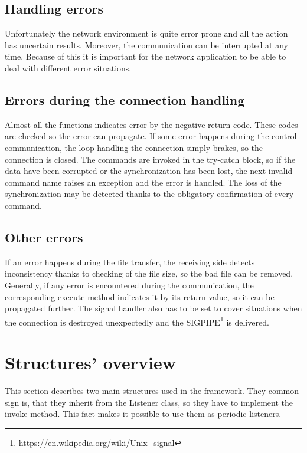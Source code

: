 \subsection{Handling errors}\label{handling-errors}

Unfortunately the network environment is quite error prone and all the
action has uncertain results. Moreover, the communication can be
interrupted at any time. Because of this it is important for the network
application to be able to deal with different error situations.

\subsection*{Errors during the connection handling}

Almost all the functions indicates error by the negative return code.
These codes are checked so the error can propagate. If some error
happens during the control communication, the loop handling the
connection simply brakes, so the connection is closed. The commands are
invoked in the try-catch block, so if the data have been corrupted or
the synchronization has been lost, the next invalid command name raises
an exception and the error is handled. The loss of the synchronization
may be detected thanks to the obligatory confirmation of every command.

\subsection*{Other errors}

If an error happens during the file transfer, the receiving side detects
inconsistency thanks to checking of the file size, so the bad file can
be removed. Generally, if any error is encountered during the
communication, the corresponding execute method indicates it by its
return value, so it can be propagated further. The signal handler also
has to be set to cover situations when the connection is destroyed
unexpectedly and the
SIGPIPE\footnote{https://en.wikipedia.org/wiki/Unix\_signal} is
delivered.

\section{Structures' overview}\label{structures-overview}

This section describes two main structures used in the framework. They
common sign is, that they inherit from the Listener class, so they have
to implement the invoke method. This fact makes it possible to use them
as \hyperref[periodic-actions]{periodic listeners}.


